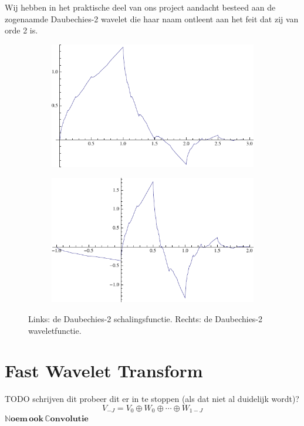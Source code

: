 \documentclass[11pt]{report}
\newcommand{\N}{\mathbb{N}}
\newcommand{\C}{\mathbb{C}}
\theoremstyle{plain}
\theoremstyle{remark}
\begin{document}
Wij hebben in het praktische deel van ons project aandacht besteed aan de zogenaamde Daubechies-2 wavelet die haar naam ontleent aan het feit dat zij van orde 2 is.

\begin{figure}[h]
\centering
\begin{subfigure}{0.48\linewidth}
	\includegraphics[width=\linewidth]{plaatjes/db2_phi.pdf}
\end{subfigure}
\begin{subfigure}{0.48\linewidth}
	\includegraphics[width=\linewidth]{plaatjes/db2_psi.pdf}
\end{subfigure}
\caption{Links: de Daubechies-2 schalingsfunctie. Rechts: de Daubechies-2 waveletfunctie.}
\end{figure}

\section{Fast Wavelet Transform}
TODO schrijven dit
probeer dit er in te stoppen (als dat niet al duidelijk wordt)?
\[
	V_{-J} = V_0 \oplus W_0 \oplus \cdots \oplus W_{1-J}
\]
$\boldsymbol{\N oem\, ook\, \C onvolutie}$
\end{document}

